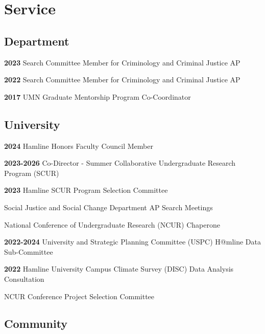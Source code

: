\documentclass[letterpaper]{article}
\newenvironment{publist}{%
  \begin{list}{}{%
    \setlength{\leftmargin}{0cm}   %
    \setlength{\labelwidth}{2cm}     %
    \setlength{\labelsep}{0.5cm}     %
  }%
}{%
  \end{list}%
}
\begin{document}
\section*{\textbf{Service}}

\subsection*{Department}
\begin{publist}

\item[\textbf{2023}] Search Committee Member for Criminology and Criminal Justice AP
\item[\textbf{2022}] Search Committee Member for Criminology and Criminal Justice AP
\item[\textbf{2017}] UMN Graduate Mentorship Program Co-Coordinator

\end{publist}

\subsection*{University}
\begin{publist}
\item[\textbf{2024}] Hamline Honors Faculty Council Member
\item[\textbf{2023-2026}] Co-Director - Summer Collaborative Undergraduate Research Program (SCUR)
\item[\textbf{2023}] Hamline SCUR Program Selection Committee
\item Social Justice and Social Change Department AP Search Meetings
\item National Conference of Undergraduate Research (NCUR) Chaperone
\item[\textbf{2022-2024}]University and Strategic Planning Committee (USPC) H@mline Data Sub-Committee
\item[\textbf{2022}] Hamline University Campus Climate Survey (DISC) Data Analysis Consultation
\item NCUR Conference Project Selection Committee
\end{publist}

\subsection*{Community}
\end{document}

